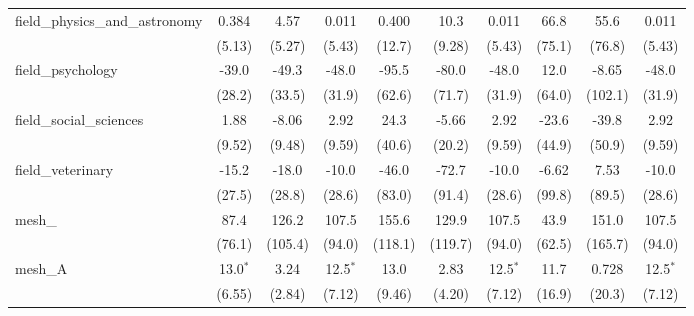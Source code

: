 \begin{tabular}{lccccccccc}
   field\_physics\_and\_astronomy                              & 0.384         & 4.57          & 0.011         & 0.400        & 10.3         & 0.011         & 66.8         & 55.6    & 0.011\\   
                                                               & (5.13)        & (5.27)        & (5.43)        & (12.7)       & (9.28)       & (5.43)        & (75.1)       & (76.8)  & (5.43)\\   
   field\_psychology                                           & -39.0         & -49.3         & -48.0         & -95.5        & -80.0        & -48.0         & 12.0         & -8.65   & -48.0\\   
                                                               & (28.2)        & (33.5)        & (31.9)        & (62.6)       & (71.7)       & (31.9)        & (64.0)       & (102.1) & (31.9)\\   
   field\_social\_sciences                                     & 1.88          & -8.06         & 2.92          & 24.3         & -5.66        & 2.92          & -23.6        & -39.8   & 2.92\\   
                                                               & (9.52)        & (9.48)        & (9.59)        & (40.6)       & (20.2)       & (9.59)        & (44.9)       & (50.9)  & (9.59)\\   
   field\_veterinary                                           & -15.2         & -18.0         & -10.0         & -46.0        & -72.7        & -10.0         & -6.62        & 7.53    & -10.0\\   
                                                               & (27.5)        & (28.8)        & (28.6)        & (83.0)       & (91.4)       & (28.6)        & (99.8)       & (89.5)  & (28.6)\\   
   mesh\_                                                      & 87.4          & 126.2         & 107.5         & 155.6        & 129.9        & 107.5         & 43.9         & 151.0   & 107.5\\   
                                                               & (76.1)        & (105.4)       & (94.0)        & (118.1)      & (119.7)      & (94.0)        & (62.5)       & (165.7) & (94.0)\\   
   mesh\_A                                                     & 13.0$^{*}$    & 3.24          & 12.5$^{*}$    & 13.0         & 2.83         & 12.5$^{*}$    & 11.7         & 0.728   & 12.5$^{*}$\\   
                                                               & (6.55)        & (2.84)        & (7.12)        & (9.46)       & (4.20)       & (7.12)        & (16.9)       & (20.3)  & (7.12)\\   

\end{tabular}
